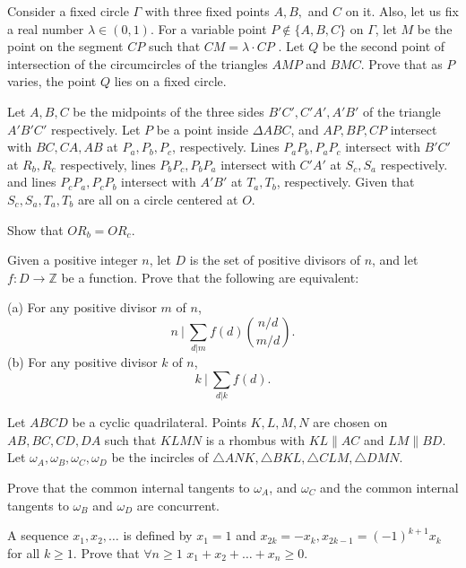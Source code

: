 \documentclass[11pt]{scrartcl}
\begin{document}
\begin{problem}[5204026586393077531]
	Consider a fixed circle $\Gamma$ with three fixed points $A, B,$ and $C$ on it. Also, let us fix a real number $\lambda \in(0,1)$. For a variable point $P \not\in\{A, B, C\}$ on $\Gamma$, let $M$ be the point on the segment $CP$ such that $CM =\lambda\cdot  CP$ . Let $Q$ be the second point of intersection of the circumcircles of the triangles $AMP$ and $BMC$. Prove that as $P$ varies, the point $Q$ lies on a fixed circle.
\end{problem}
\begin{problem}[5261846980754565299]
	Let $A,B,C$ be the midpoints of the three sides $B'C', C'A', A'B'$ of the triangle $A'B'C'$ respectively. Let $P$ be a point inside $\Delta ABC$, and $AP,BP,CP$ intersect with $BC, CA, AB$ at $P_a,P_b,P_c$, respectively. Lines $P_aP_b, P_aP_c$ intersect with $B'C'$ at $R_b, R_c$ respectively, lines $P_bP_c, P_bP_a$ intersect with $C'A'$ at $S_c, S_a$ respectively. and lines $P_cP_a, P_cP_b$ intersect with $A'B'$ at $T_a, T_b$, respectively. Given that $S_c,S_a, T_a, T_b$ are all on a circle centered at $O$.

Show that $OR_b=OR_c$.
\end{problem}
\begin{problem}[5270684768551762250]
	Given a positive integer $n$, let $D$ is the set of positive divisors of $n$, and let $f: D \to \mathbb{Z}$ be a function. Prove that the following are equivalent:

(a) For any positive divisor $m$ of $n$,
\[ n ~\Big|~ \sum_{d|m} f(d) \binom{n/d}{m/d}. \](b) For any positive divisor $k$ of $n$,
\[ k ~\Big|~ \sum_{d|k} f(d). \]
\end{problem}
\begin{problem}[5299971832672937326]
Let $ABCD$ be a cyclic quadrilateral. Points $K, L, M, N$ are chosen on $AB, BC, CD, DA$ such that $KLMN$ is a rhombus with $KL \parallel AC$ and $LM \parallel BD$. Let $\omega_A, \omega_B, \omega_C, \omega_D$ be the incircles of $\triangle ANK, \triangle BKL, \triangle CLM, \triangle DMN$.

Prove that the common internal tangents to $\omega_A$, and $\omega_C$ and the common internal tangents to $\omega_B$ and $\omega_D$ are concurrent.
\end{problem}
\begin{problem}[5326267355571829268]
A sequence $x_1, x_2, \ldots$ is defined by $x_1 = 1$ and $x_{2k}=-x_k, x_{2k-1} = (-1)^{k+1}x_k$ for all $k \geq 1.$ Prove that $\forall n \geq 1$ $x_1 + x_2 + \ldots + x_n \geq 0.$
\end{problem}
\end{document}
